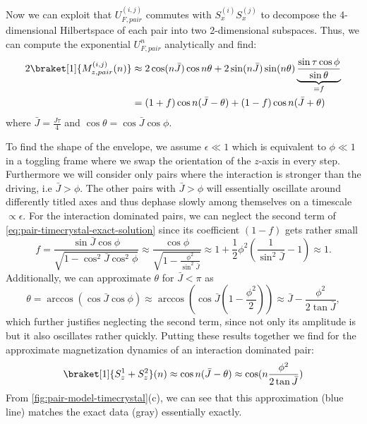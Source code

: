 Now we can exploit that $U_{F,pair}^{(i,j)}$ commutes with $S_x^{(i)}S_x^{(j)}$ to decompose the 4-dimensional Hilbertspace of each pair into two 2-dimensional subspaces. Thus, we can compute the exponential $U_{F,pair}^n$ analytically and find:
\begin{align}\label{eq:pair-timecrystal-exact-solution}
	2\braket[1]{M^{(i,j)}_{z,pair}(n)} &\approx 2\cos(n\bar{J})\cos{n\theta} +
		2\sin(n\bar{J})\sin(n\theta)\underbrace{\frac{\sin\tau\cos\phi}{\sin\theta}}_{\equiv f}\\
	&= (1+f)\cos n(\bar{J}-\theta) + (1-f)\cos n(\bar{J}+\theta)
\end{align}
where $\bar{J}=\frac{J\tau}{4}$ and $\cos\theta = \cos\bar{J}\cos\phi$.

To find the shape of the envelope, we assume $\epsilon\ll 1$ which is equivalent to $\phi \ll 1$ in a toggling frame where we swap the orientation of the $z$-axis in every step. Furthermore we will consider only pairs where the interaction is stronger than the driving, i.e $\bar{J}>\phi$. The other pairs with $\bar{J}>\phi$ will essentially oscillate around differently titled axes and thus dephase slowly among themselves on a timescale $\propto \epsilon$.
For the interaction dominated pairs, we can neglect the second term of \autoref{eq:pair-timecrystal-exact-solution} since its coefficient $(1-f)$ gets rather small
\begin{equation}
	f = \frac{\sin\bar{J}\cos\phi}{\sqrt{1-\cos^2\bar{J}\cos^2\phi}}\approx \frac{\cos\phi}{\sqrt{1-\frac{\phi^2}{\sin^2\bar{J}}}}\approx 1+\frac{1}{2}\phi^2\left(\frac{1}{\sin^2\bar{J}}-1\right) \approx 1.
\end{equation}
Additionally, we can approximate $\theta$ for $\bar{J}<\pi$ as
\begin{equation}
	\theta = \arccos(\cos\bar{J}\cos\phi) \approx \arccos(\cos\bar{J}(1-\frac{\phi^2}{2}))\approx \bar{J} -\frac{\phi^2}{2\tan\bar{J}},
\end{equation}
which further justifies neglecting the second term, since not only its amplitude is but it also oscillates rather quickly.
Putting these results together we find for the approximate magnetization dynamics of an interaction dominated pair:
\begin{align}\label{eq:mz-interaction-dominated}
	\braket[1]{S_z^1+S_z^2}(n) \approx \cos n(\bar{J}-\theta) \approx \cos(n\frac{\phi^2}{2\tan\bar{J}})
\end{align}
From \autoref{fig:pair-model-timecrystal}(c), we can see that this approximation (blue line) matches the exact data (gray) essentially exactly.

